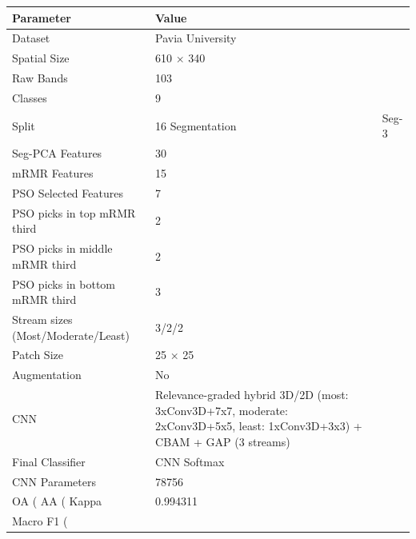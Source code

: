 \begin{tabular}{ll}
\toprule
Parameter & Value \\
\midrule
Dataset & Pavia University \\
Spatial Size & 610 × 340 \\
Raw Bands & 103 \\
Classes & 9 \\
Split & 16%
Segmentation & Seg-3 \\
Seg-PCA Features & 30 \\
mRMR Features & 15 \\
PSO Selected Features & 7 \\
PSO picks in top mRMR third & 2 \\
PSO picks in middle mRMR third & 2 \\
PSO picks in bottom mRMR third & 3 \\
Stream sizes (Most/Moderate/Least) & 3/2/2 \\
Patch Size & 25 × 25 \\
Augmentation & No \\
CNN & Relevance-graded hybrid 3D/2D (most: 3xConv3D+7x7, moderate: 2xConv3D+5x5, least: 1xConv3D+3x3) + CBAM + GAP (3 streams) \\
Final Classifier & CNN Softmax \\
CNN Parameters & 78756 \\
OA (%
AA (%
Kappa & 0.994311 \\
Macro F1 (%
\bottomrule
\end{tabular}
